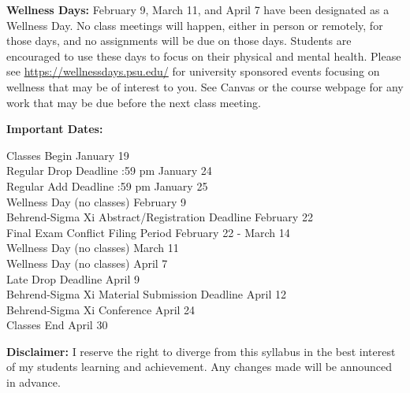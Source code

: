 \documentclass[11pt]{article}
\begin{document}
\newpage
\noindent\textbf{Wellness Days:}
February 9, March 11, and April 7 have been designated as a Wellness Day. No class meetings will happen, either in person or remotely, for those days, and no assignments will be due on those days. Students are encouraged to use these days to focus on their physical and mental health. Please see \url{https://wellnessdays.psu.edu/} for university sponsored events focusing on wellness that may be of interest to you. See Canvas or the course webpage for any work that may be due before the next class meeting. 

\vspace*{.10in}
\noindent\textbf{Important Dates:}
\begin{flushleft}
Classes Begin \dotfill January 19\\
Regular Drop Deadline :59 pm January 24\\
Regular Add Deadline  :59 pm January 25\\
Wellness Day (no classes) \dotfill February 9\\
Behrend-Sigma Xi Abstract/Registration Deadline \dotfill February 22 \\
Final Exam Conflict Filing Period \dotfill February 22 - March 14\\
Wellness Day (no classes) \dotfill March 11\\
Wellness Day (no classes) \dotfill April 7\\
Late Drop Deadline \dotfill April 9\\
Behrend-Sigma Xi Material Submission Deadline \dotfill April 12 \\
Behrend-Sigma Xi Conference \dotfill April 24 \\
Classes End \dotfill April 30\\
\end{flushleft}
\vspace*{.10in}
\noindent\textbf{Disclaimer:}
I reserve the right to diverge from this syllabus in the best interest of my students learning and achievement.
Any changes made will be announced in advance. 
\end{document}
